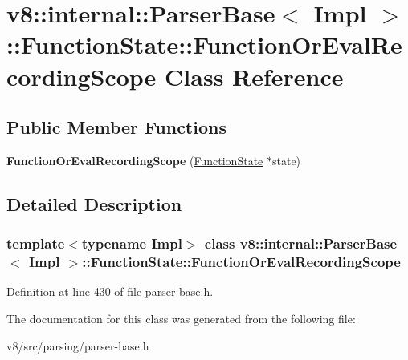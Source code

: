 \hypertarget{classv8_1_1internal_1_1ParserBase_1_1FunctionState_1_1FunctionOrEvalRecordingScope}{}\section{v8\+:\+:internal\+:\+:Parser\+Base$<$ Impl $>$\+:\+:Function\+State\+:\+:Function\+Or\+Eval\+Recording\+Scope Class Reference}
\label{classv8_1_1internal_1_1ParserBase_1_1FunctionState_1_1FunctionOrEvalRecordingScope}
\subsection*{Public Member Functions}
\begin{DoxyCompactItemize}
\item 
\mbox{\label{classv8_1_1internal_1_1ParserBase_1_1FunctionState_1_1FunctionOrEvalRecordingScope_a0b0b79546d4d64133288edaf91090529}} 
{\bfseries Function\+Or\+Eval\+Recording\+Scope} (\mbox{\hyperlink{classv8_1_1internal_1_1ParserBase_1_1FunctionState}{Function\+State}} $\ast$state)
\end{DoxyCompactItemize}


\subsection{Detailed Description}
\subsubsection*{template$<$typename Impl$>$\newline
class v8\+::internal\+::\+Parser\+Base$<$ Impl $>$\+::\+Function\+State\+::\+Function\+Or\+Eval\+Recording\+Scope}



Definition at line 430 of file parser-\/base.\+h.



The documentation for this class was generated from the following file\+:\begin{DoxyCompactItemize}
\item 
v8/src/parsing/parser-\/base.\+h\end{DoxyCompactItemize}
